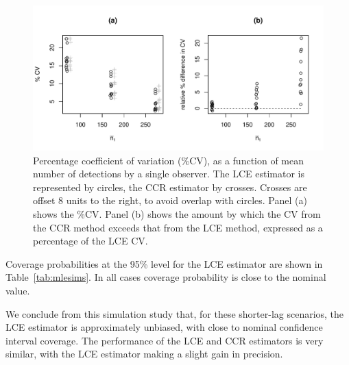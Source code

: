 \documentclass[useAMS, usenatbib, referee]{biom}\usepackage[]{graphicx}\usepackage[]{color}
\makeatletter
\def\maxwidth{ %
  \ifdim\Gin@nat@width>\linewidth
    \linewidth
  \else
    \Gin@nat@width
  \fi
}
\newenvironment{knitrout}{}{} %
\makeatother
\begin{document}
\begin{knitrout}
\color{fgcolor}\begin{figure}

{\centering \includegraphics[width=\maxwidth]{figs/fig_mlepalm_cv-1} 

}

\caption[Percentage coefficient of variation (\%CV), as a function of mean number of detections by a single observer]{Percentage coefficient of variation (\%CV), as a function of mean number of detections by a single observer. The LCE estimator is represented by circles, the CCR estimator by crosses. Crosses are offset 8 units to the right, to avoid overlap with circles. Panel (a) shows the \%CV. Panel (b) shows the amount by which the CV from the CCR method exceeds that from the LCE method, expressed as a percentage of the LCE CV.}\label{fig:fig_mlepalm_cv}
\end{figure}


\end{knitrout}

Coverage probabilities at the 95\% level for the LCE estimator are shown in Table~\ref{tab:mlesims}. In all cases coverage probability is close to the nominal value.


We conclude from this simulation study that, for these shorter-lag scenarios, the LCE estimator is approximately unbiased, with close to nominal confidence interval coverage. The performance of the LCE and CCR estimators is very similar, with the LCE estimator making a slight gain in precision.
\end{document}
